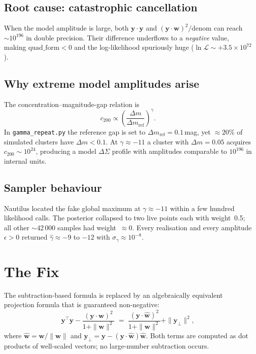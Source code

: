 \documentclass[11pt, a4paper]{article}
\begin{document}
\subsection{Root cause: catastrophic cancellation}

When the model amplitude is large, both $\mathbf{y}\cdot\mathbf{y}$ and
$(\mathbf{y}\cdot\mathbf{w})^2/\mathrm{denom}$ can reach $\sim10^{196}$ in
double precision.
Their difference underflows to a \emph{negative} value, making
$\mathrm{quad\_form}<0$ and the log-likelihood spuriously huge
($\ln\mathcal{L}\sim+3.5\times10^{72}$).

\subsection{Why extreme model amplitudes arise}

The concentration--magnitude-gap relation is
\begin{equation}
    c_{200} \propto \left(\frac{\Delta m}{\Delta m_\mathrm{ref}}\right)^{\!\gamma}.
\end{equation}
In \texttt{gamma\_repeat.py} the reference gap is set to
$\Delta m_\mathrm{ref}=0.1$\,mag, yet $\approx20\%$ of simulated clusters
have $\Delta m < 0.1$.
At $\gamma\approx-11$ a cluster with $\Delta m=0.05$ acquires
$c_{200}\sim10^{24}$, producing a model $\Delta\Sigma$ profile with
amplitudes comparable to $10^{196}$ in internal units.

\subsection{Sampler behaviour}

Nautilus located the fake global maximum at $\gamma\approx-11$ within a few
hundred likelihood calls.
The posterior collapsed to two live points each with weight~0.5; all other
$\sim$42\,000 samples had weight~$\approx0$.
Every realisation and every amplitude $\epsilon>0$ returned
$\hat\gamma\approx-9$ to $-12$ with $\sigma_\gamma\approx10^{-8}$.

\section{The Fix}

The subtraction-based formula is replaced by an algebraically equivalent
projection formula that is guaranteed non-negative:
\begin{equation}
    \mathbf{y}^\top\mathbf{y}
    - \frac{(\mathbf{y}\cdot\mathbf{w})^2}{1+\|\mathbf{w}\|^2}
    \;=\;
    \frac{(\mathbf{y}\cdot\hat{\mathbf{w}})^2}{1+\|\mathbf{w}\|^2}
    + \|\mathbf{y}_\perp\|^2,
\end{equation}
where $\hat{\mathbf{w}}=\mathbf{w}/\|\mathbf{w}\|$ and
$\mathbf{y}_\perp = \mathbf{y} - (\mathbf{y}\cdot\hat{\mathbf{w}})\hat{\mathbf{w}}$.
Both terms are computed as dot products of well-scaled vectors; no large-number
subtraction occurs.
\end{document}
